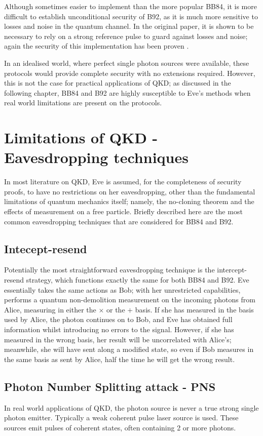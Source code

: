 \documentclass[paper=a4, fontsize=11pt]{scrartcl} %
\numberwithin{equation}{section} %
\numberwithin{figure}{section} %
\numberwithin{table}{section} %
\begin{document}
Although sometimes easier to implement than the more popular BB84, it is more difficult to establish
unconditional security of B92, as it is much more sensitive to losses and noise in the
quantum channel. In the original paper, it is shown to be necessary
to rely on a strong reference pulse to guard against
losses and noise; again the security of this implementation has been proven
\citep{tamakiStrongRefProofB92}.

In an idealised world, where perfect single photon sources were available,
these protocols would provide complete security with no extensions required.
However, this is not the case for practical applications of QKD;
as discussed in the following chapter, BB84 and B92 are highly susceptible to
Eve's methods when real world limitations are present on the protocols.

\section{Limitations of QKD - Eavesdropping techniques}
In most literature on QKD, Eve is assumed, for the completeness of security proofs, to have no restrictions
on her eavesdropping, other than the fundamental limitations of quantum mechanics itself; namely, the
no-cloning theorem and the effects of measurement on a free particle. Briefly described here are the
most common eavesdropping techniques that are considered for BB84 and B92.

\subsection{Intecept-resend}
Potentially the most straightforward eavesdropping technique is the intercept-resend
strategy, which functions exactly the same for both BB84 and  B92.
Eve essentially takes the same actions as Bob; with her unrestricted capabilities, performs
a quantum non-demolition measurement on the incoming photons from Alice, measuring in either the $\times$
or the $+$ basis. If she has measured in the basis used by Alice, the photon continues on to Bob,
and Eve has obtained full information whilst introducing no errors to the signal. However, if she has measured
in the wrong basis, her result will be uncorrelated with Alice's; meanwhile, she will have sent along
a modified state, so even if Bob measures in the same basis as sent by Alice, half the time he will get the
wrong result. \citep{reviewScariani}


\subsection{Photon Number Splitting attack - PNS}
In real world applications of QKD, the photon source is never a true strong single photon emitter. Typically
a weak coherent pulse laser source is used. \citep{satellites}
These sources emit pulses of coherent states, often containing 2 or more photons.
\end{document}
